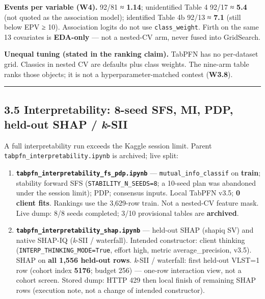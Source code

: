 \documentclass[
]{article}
\begin{document}
\textbf{Events per variable (W4).} 92/81 ≈ \textbf{1.14}; unidentified
Table 4 92/17 ≈ \textbf{5.4} (not quoted as the association model);
identified Table 4b 92/13 ≈ \textbf{7.1} (still below EPV ≥ 10).
Association logits do not use \texttt{class\_weight}. Firth on the same
13 covariates is \textbf{EDA-only} --- not a nested-CV arm, never fused
into GridSearch.

\textbf{Unequal tuning (stated in the ranking claim).} TabPFN has no
per-dataset grid. Classics in nested CV are defaults plus class weights.
The nine-arm table ranks those objects; it is not a
hyperparameter-matched contest (\textbf{W3.8}).

\begin{center}\rule{0.5\linewidth}{0.5pt}\end{center}

\subsection{\texorpdfstring{3.5 Interpretability: 8-seed SFS, MI, PDP,
held-out SHAP /
\emph{k}-SII}{3.5 Interpretability: 8-seed SFS, MI, PDP, held-out SHAP / k-SII}}\label{interpretability-8-seed-sfs-mi-pdp-held-out-shap-k-sii}

A full interpretability run exceeds the Kaggle session limit. Parent
\texttt{tabpfn\_interpretability.ipynb} is archived; live split:

\begin{enumerate}
\def\labelenumi{\arabic{enumi}.}
\item
  \textbf{\texttt{tabpfn\_interpretability\_fs\_pdp.ipynb}} ---
  \texttt{mutual\_info\_classif} on \textbf{train}; stability forward
  SFS (\texttt{STABILITY\_N\_SEEDS=8}; a 10-seed plan was abandoned
  under the session limit); PDP; consensus inputs. Local TabPFN v3.5;
  \textbf{0 client fits}. Rankings use the 3,629-row train. Not a
  nested-CV feature mask. Live dump: 8/8 seeds completed; 3/10
  provisional tables are \textbf{archived}.
\item
  \textbf{\texttt{tabpfn\_interpretability\_shap.ipynb}} --- held-out
  SHAP (shapiq SV) and native SHAP-IQ (\emph{k}-SII / waterfall).
  Intended constructor: client thinking
  (\texttt{INTERP\_THINKING\_MODE=True}, effort high, metric
  average\_precision, v3.5). SHAP on \textbf{all 1,556 held-out rows}.
  \emph{k}-SII / waterfall: first held-out VLST=1 row (cohort index
  \textbf{5176}; budget 256) --- one-row interaction view, not a cohort
  screen. Stored dump: HTTP 429 then local finish of remaining SHAP rows
  (execution note, not a change of intended constructor).
\end{enumerate}
\end{document}
